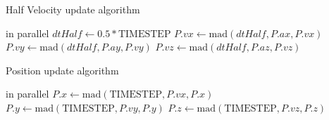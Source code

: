 \documentclass{thesis}
\begin{document}
\begin{algorithm}
    \label{alg:HalfVelocity}
    \caption{Half Velocity update algorithm}
    \begin{algorithmic}
         in parallel
            \State $dtHalf \gets 0.5 * \text{TIMESTEP}$
            \State $P.vx \gets \text{mad}(dtHalf, P.ax, P.vx)$
            \State $P.vy \gets \text{mad}(dtHalf, P.ay, P.vy)$
            \State $P.vz \gets \text{mad}(dtHalf, P.az, P.vz)$
        \EndFor
    \end{algorithmic}
\end{algorithm}
\begin{algorithm}
    \label{alg:PositionUpdate}
    \caption{Position update algorithm}
    \begin{algorithmic}
         in parallel
            \State $P.x \gets \text{mad}(\text{TIMESTEP}, P.vx, P.x)$
            \State $P.y \gets \text{mad}(\text{TIMESTEP}, P.vy, P.y)$
            \State $P.z \gets \text{mad}(\text{TIMESTEP}, P.vz, P.z)$
        \EndFor
    \end{algorithmic}
\end{algorithm}
\end{document}
